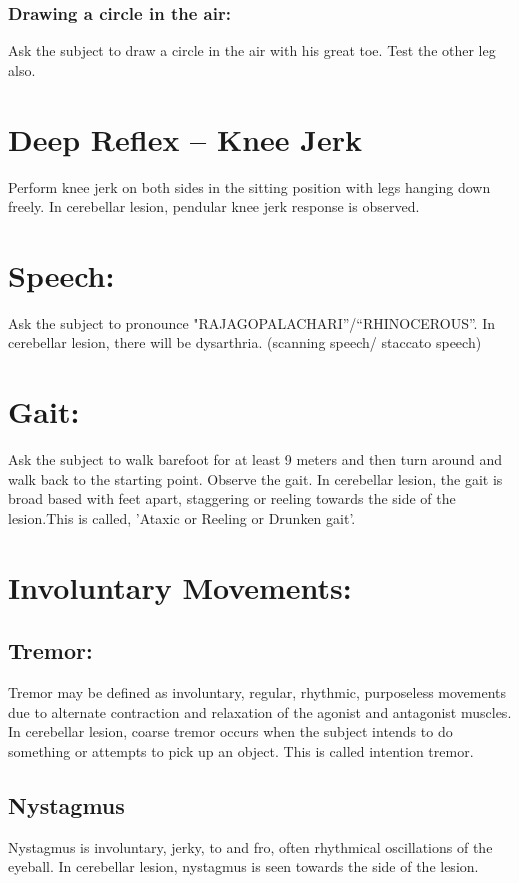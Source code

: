 \documentclass[a4paper,12pt,openany,twoside]{book}
\begin{document}
\subsubsection*{Drawing a circle in the air:}
				Ask the subject to draw a circle in the air with his great toe. Test the other leg  also.
				\section*{Deep Reflex – Knee Jerk}
					Perform knee jerk on both sides in the sitting position with legs hanging down freely.
						In cerebellar lesion, pendular knee jerk response is observed.

						\section*{Speech:}
						Ask the subject to pronounce "RAJAGOPALACHARI”/“RHINOCEROUS”.
							In cerebellar lesion, there will be dysarthria. (scanning speech/ staccato speech)
							\section*{Gait:}
								Ask the subject to walk barefoot for at least 9 meters and then turn around and walk back to the starting point. Observe the gait.
									In cerebellar lesion, the gait is broad based with feet apart, staggering or reeling towards the side of the lesion.This is called, 'Ataxic or Reeling or Drunken gait'.
								\section*{Involuntary Movements:} 
								\subsection*{Tremor:}
										Tremor may be defined as involuntary, regular, rhythmic, purposeless movements due to alternate contraction and relaxation of the agonist and antagonist muscles.
											In cerebellar lesion, coarse tremor occurs when the subject intends to do something or attempts to pick up an object. This is called intention tremor.
											\subsection*{Nystagmus}
											Nystagmus is involuntary, jerky, to and fro, often rhythmical oscillations of the eyeball. In cerebellar lesion, nystagmus is seen towards the side of the lesion.
\end{document}

